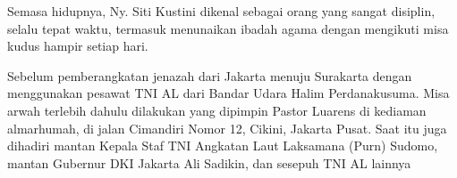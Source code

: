 Semasa hidupnya, Ny. Siti Kustini dikenal sebagai orang yang sangat disiplin, selalu tepat  waktu, termasuk menunaikan ibadah agama dengan mengikuti misa kudus hampir  setiap hari.

Sebelum pemberangkatan jenazah dari Jakarta menuju Surakarta dengan menggunakan pesawat TNI AL dari Bandar Udara Halim Perdanakusuma. Misa arwah terlebih dahulu dilakukan yang dipimpin Pastor Luarens di kediaman almarhumah, di jalan  Cimandiri Nomor 12, Cikini, Jakarta Pusat. Saat itu juga dihadiri mantan Kepala  Staf TNI Angkatan Laut Laksamana (Purn) Sudomo, mantan Gubernur DKI Jakarta Ali  Sadikin, dan sesepuh TNI AL lainnya



